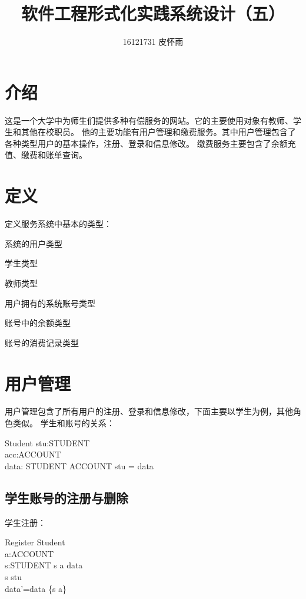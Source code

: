 \documentclass{article}
\author{16121731 皮怀雨}
\title{软件工程形式化实践系统设计（五）}
\begin{document}
\begin{CJK}{UTF8}{gbsn}
\maketitle
\begin{spacing}{1.4}
\renewcommand{\CJKglue}{\hskip 0.5pt}

\section{介绍}
这是一个大学中为师生们提供多种有偿服务的网站。它的主要使用对象有教师、学生和其他在校职员。
他的主要功能有用户管理和缴费服务。其中用户管理包含了各种类型用户的基本操作，注册、登录和信息修改。
缴费服务主要包含了余额充值、缴费和账单查询。

\section{定义}

定义服务系统中基本的类型：
\begin{zed}[USER]\end{zed}
系统的用户类型
\begin{zed}[STUDENT]\end{zed}	
学生类型
\begin{zed}[TEACHER]\end{zed}
教师类型
\begin{zed}[ACCOUNT]\end{zed}
用户拥有的系统账号类型
\begin{zed}[BALANCE]\end{zed}
账号中的余额类型
\begin{zed}[RECORD]\end{zed}
账号的消费记录类型

\section{用户管理}
用户管理包含了所有用户的注册、登录和信息修改，下面主要以学生为例，其他角色类似。
学生和账号的关系：
\begin{schema}{Student} 
	stu:\power STUDENT \\
	acc:\power ACCOUNT \\
	data: STUDENT \pfun ACCOUNT 
\where stu = \dom data \end{schema}
\subsection{学生账号的注册与删除}
学生注册：
\begin{schema}{Register} 
	\Delta Student\\
	a:ACCOUNT\\
	s:STUDENT
\where 
    s \mapsto a \notin data\\
	s \in stu \\
	data'=data \cup \{s \mapsto a\}
\end{schema}


\end{spacing}
\end{CJK}
\end{document}
